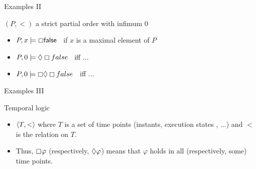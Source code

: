 \documentclass{beamer}
\begin{document}
\begin{slide}{Examples II}\label{s:16}
\small
\begin{block}{$(P,<)$ a strict partial order with infimum $0$}
~\\

\begin{itemize}
\item $P, x \models \boxempty \mathsf{false}\; \;$  if $x$ is a maximal element of $P$
\item $P, 0 \models \Diamond \boxempty false\; \;$  iff  ... %
\item $P, 0 \models \boxempty \Diamond \boxempty false\; \;$  iff  ... %
\end{itemize}
\end{block}
\end{slide}





\begin{slide}{Examples III}\label{s:18}
\small
\begin{block}{Temporal logic}
\begin{itemize}
\item $\mathopen{\langle}T, <\mathclose{\rangle}$ where $T$ is a set of time points (instants, execution states , ...) and $<$ is the  relation on $T$.
\item Thus, $\boxempty \varphi$ (respectively, $\Diamond \varphi$) means that $\varphi$ holds in all (respectively, some)  time points.
\end{itemize}
\end{block}
\end{slide}
\end{document}
